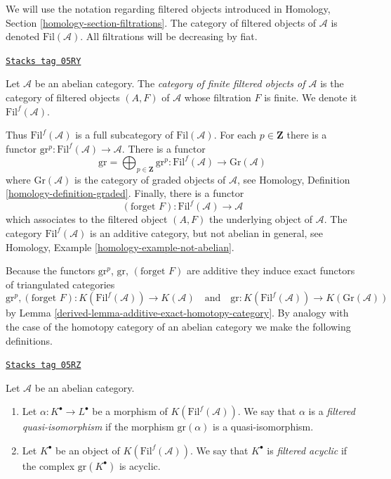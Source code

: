 \medskip\noindent
We will use the notation regarding filtered objects introduced in
Homology, Section \ref{homology-section-filtrations}.
The category of filtered objects of $\mathcal{A}$ is
denoted $\text{Fil}(\mathcal{A})$.
All filtrations will be decreasing by fiat.

\begin{definition}
\label{derived-definition-finite-filtered}
\href{https://stacks.math.columbia.edu/tag/05RY}{\texttt{Stacks tag 05RY}}

Let $\mathcal{A}$ be an abelian category. The
{\it category of finite filtered objects of $\mathcal{A}$}
is the category of filtered objects
$(A, F)$ of $\mathcal{A}$ whose filtration $F$ is finite.
We denote it $\text{Fil}^f(\mathcal{A})$.
\end{definition}

Thus $\text{Fil}^f(\mathcal{A})$ is a full subcategory of
$\text{Fil}(\mathcal{A})$. For each $p \in \mathbf{Z}$ there is
a functor
$\text{gr}^p : \text{Fil}^f(\mathcal{A}) \to \mathcal{A}$.
There is a functor
$$
\text{gr} = \bigoplus\nolimits_{p \in \mathbf{Z}} \text{gr}^p :
\text{Fil}^f(\mathcal{A}) \to \text{Gr}(\mathcal{A})
$$
where $\text{Gr}(\mathcal{A})$ is the category of graded objects of
$\mathcal{A}$, see Homology, Definition \ref{homology-definition-graded}.
Finally, there is a functor
$$
(\text{forget }F) : \text{Fil}^f(\mathcal{A}) \longrightarrow \mathcal{A}
$$
which associates to the filtered object $(A, F)$ the underlying object
of $\mathcal{A}$.
The category $\text{Fil}^f(\mathcal{A})$ is an additive category, but not
abelian in general, see
Homology, Example \ref{homology-example-not-abelian}.

\medskip\noindent
Because the functors $\text{gr}^p$, $\text{gr}$, $(\text{forget }F)$
are additive they induce exact functors of triangulated categories
$$
\text{gr}^p, (\text{forget }F) :
K(\text{Fil}^f(\mathcal{A}))
\to
K(\mathcal{A})
\quad\text{and}\quad
\text{gr} :
K(\text{Fil}^f(\mathcal{A}))
\to
K(\text{Gr}(\mathcal{A}))
$$
by
Lemma \ref{derived-lemma-additive-exact-homotopy-category}.
By analogy with the case of the homotopy category of an abelian category
we make the following definitions.

\begin{definition}
\label{derived-definition-filtered-acyclic}
\href{https://stacks.math.columbia.edu/tag/05RZ}{\texttt{Stacks tag 05RZ}}

Let $\mathcal{A}$ be an abelian category.
\begin{enumerate}
\item Let $\alpha : K^\bullet \to L^\bullet$ be a morphism of
$K(\text{Fil}^f(\mathcal{A}))$. We say that
$\alpha$ is a {\it filtered quasi-isomorphism} if
the morphism $\text{gr}(\alpha)$ is a quasi-isomorphism.
\item Let $K^\bullet$ be an object of $K(\text{Fil}^f(\mathcal{A}))$.
We say that $K^\bullet$ is {\it filtered acyclic} if
the complex $\text{gr}(K^\bullet)$ is acyclic.
\end{enumerate}
\end{definition}


